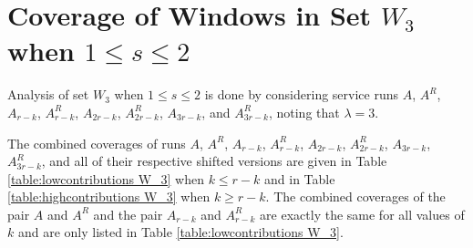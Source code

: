 \documentclass[11pt]{article}
\begin{document}
\section{Coverage of Windows in Set $W_3$ when $1 \leq s \leq 2$}
\label{appendix:1<s<2 W_3}

Analysis of set $W_3$ when $1 \leq s \leq 2$ is done by considering service runs $A$, $A^R$, $A_{r - k}$, $A_{r - k}^R$, $A_{2r - k}$, $A_{2r - k}^R$, $A_{3r - k}$, and $A_{3r - k}^R$, noting that $\lambda = 3$.  

The combined coverages of runs $A$, $A^R$, $A_{r - k}$, $A_{r - k}^R$, $A_{2r - k}$, $A_{2r - k}^R$, $A_{3r - k}$, $A_{3r - k}^R$, and all of their respective shifted versions are given in Table \ref{table:lowcontributions W_3} when $k \leq r - k$ and in Table \ref{table:highcontributions W_3} when $k \geq r - k$.  The combined coverages of the pair $A$ and $A^R$ and the pair $A_{r - k}$ and $A_{r - k}^R$ are exactly the same for all values of $k$ and are only listed in Table \ref{table:lowcontributions W_3}.
\end{document}
